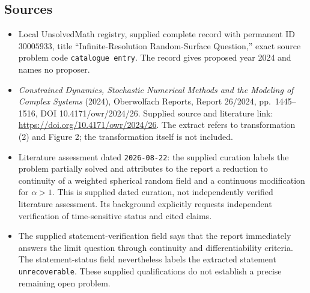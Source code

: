 \documentclass[11pt]{article}
\begin{document}
\subsection{Sources}
\begin{itemize}
\item Local UnsolvedMath registry, supplied complete record with permanent ID \(30005933\), title ``Infinite-Resolution Random-Surface Question,'' exact source problem code \texttt{catalogue entry}. The record gives proposed year 2024 and names no proposer.
\item \emph{Constrained Dynamics, Stochastic Numerical Methods and the Modeling of Complex Systems} (2024), Oberwolfach Reports, Report 26/2024, pp.\ 1445--1516, DOI 10.4171/owr/2024/26. Supplied source and literature link: \url{https://doi.org/10.4171/owr/2024/26}. The extract refers to transformation (2) and Figure 2; the transformation itself is not included.
\item Literature assessment dated \texttt{2026-08-22}: the supplied curation labels the problem partially solved and attributes to the report a reduction to continuity of a weighted spherical random field and a continuous modification for \(\alpha>1\). This is supplied dated curation, not independently verified literature assessment. Its background explicitly requests independent verification of time-sensitive status and cited claims.
\item The supplied statement-verification field says that the report immediately answers the limit question through continuity and differentiability criteria. The statement-status field nevertheless labels the extracted statement \texttt{unrecoverable}. These supplied qualifications do not establish a precise remaining open problem.
\end{itemize}
\end{document}
